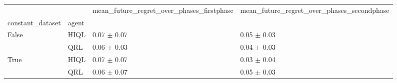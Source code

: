 \begin{tabular}{llll}
\toprule
 &  & mean_future_regret_over_phases_firstphase & mean_future_regret_over_phases_secondphase \\
constant_dataset & agent &  &  \\
\midrule
\multirow[t]{2}{*}{False} & HIQL & 0.07 $\pm$ 0.07 & 0.05 $\pm$ 0.03 \\
 & QRL & 0.06 $\pm$ 0.03 & 0.04 $\pm$ 0.03 \\
\cline{1-4}
\multirow[t]{2}{*}{True} & HIQL & 0.07 $\pm$ 0.07 & 0.03 $\pm$ 0.04 \\
 & QRL & 0.06 $\pm$ 0.07 & 0.05 $\pm$ 0.03 \\
\cline{1-4}
\bottomrule
\end{tabular}

